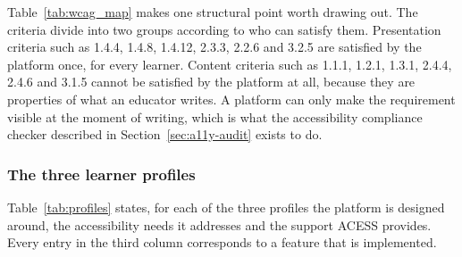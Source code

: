 \documentclass[12pt, oneside]{article} %
\begin{document}
Table~\ref{tab:wcag_map} makes one structural point worth drawing out. The criteria divide into two groups according to who can satisfy them. Presentation criteria such as 1.4.4, 1.4.8, 1.4.12, 2.3.3, 2.2.6 and 3.2.5 are satisfied by the platform once, for every learner. Content criteria such as 1.1.1, 1.2.1, 1.3.1, 2.4.4, 2.4.6 and 3.1.5 cannot be satisfied by the platform at all, because they are properties of what an educator writes. A platform can only make the requirement visible at the moment of writing, which is what the accessibility compliance checker described in Section~\ref{sec:a11y-audit} exists to do.

\subsubsection{The three learner profiles}

Table~\ref{tab:profiles} states, for each of the three profiles the platform is designed around, the accessibility needs it addresses and the support ACESS provides. Every entry in the third column corresponds to a feature that is implemented.
\end{document}
